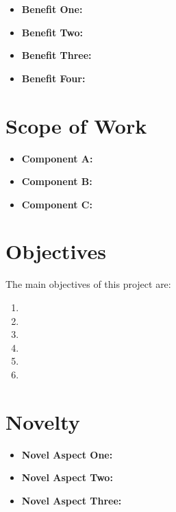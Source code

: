 \documentclass[12pt, a4paper, oneside]{report}
\begin{document}
\lipsum[9][1-3]

\begin{itemize}
    \item \textbf{Benefit One:} \lipsum[10][1-2]
    \item \textbf{Benefit Two:} \lipsum[11][1-2]
    \item \textbf{Benefit Three:} \lipsum[12][1-2]
    \item \textbf{Benefit Four:} \lipsum[13][1-2]
\end{itemize}

\section{Scope of Work}
\label{sec:scope}

\lipsum[14][1-3]

\begin{itemize}
    \item \textbf{Component A:} \lipsum[15][1-2]
    \item \textbf{Component B:} \lipsum[16][1-2]
    \item \textbf{Component C:} \lipsum[17][1-2]
\end{itemize}

\lipsum[18][1-3]

\section{Objectives}
\label{sec:objectives}

The main objectives of this project are:

\begin{enumerate}
    \item \lipsum[19][1-1]
    \item \lipsum[20][1-1]
    \item \lipsum[21][1-1]
    \item \lipsum[22][1-1]
    \item \lipsum[23][1-1]
    \item \lipsum[24][1-1]
\end{enumerate}

\section{Novelty}
\label{sec:novelty}

\lipsum[25][1-3]

\begin{itemize}
    \item \textbf{Novel Aspect One:} \lipsum[26][1-2]
    \item \textbf{Novel Aspect Two:} \lipsum[27][1-2]
    \item \textbf{Novel Aspect Three:} \lipsum[28][1-2]
\end{itemize}
\end{document}
